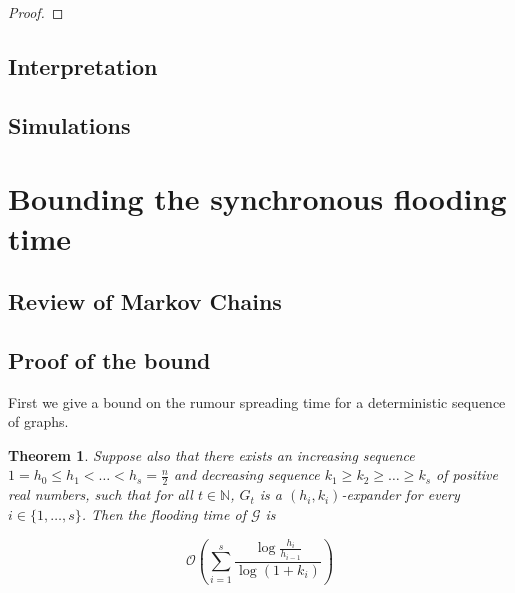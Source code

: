 \documentclass[a4paper,11pt]{article}
\newtheorem{theorem}{Theorem}[section]
\theoremstyle{definition}
\begin{document}
\begin{proof}
	
\end{proof}

\subsection{Interpretation}


\subsection{Simulations}




\section{Bounding the synchronous flooding time}

\subsection{Review of Markov Chains}

\subsection{Proof of the bound}

First we give a bound on the rumour spreading time for a deterministic sequence of graphs. 

\begin{theorem}
	\ModelIntro Suppose also that there exists an increasing sequence $1 = h_0 \leq h_1 < \dots < h_s = \frac{n}{2}$ and decreasing sequence $k_1 \geq k_2 \geq \dots \geq k_s$ of positive real numbers, such that for all $t \in \mathbb{N}$, $G_t$ is a $(h_i, k_i)$-expander for every $i \in \{1, \dots , s\}$. Then the flooding time of $\mathcal{G}$ is

	$$
		\mathcal{O}\left(\sum_{i=1}^s \frac{\log \frac{h_i}{h_{i-1}}}{\log(1+k_i)}\right)
	$$
\end{theorem}
\end{document}
